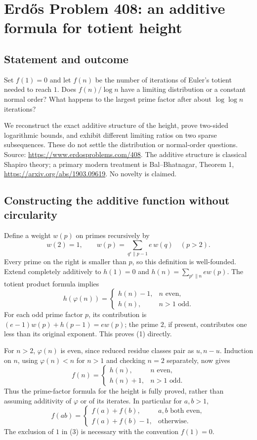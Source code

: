 \section*{Erd\H{o}s Problem 408: an additive formula for totient height}
\subsection*{Statement and outcome}
Set $f(1)=0$ and let $f(n)$ be the number of iterations of Euler's totient needed to reach $1$. Does $f(n)/\log n$ have a limiting distribution or a constant normal order? What happens to the largest prime factor after about $\log\log n$ iterations?

We reconstruct the exact additive structure of the height, prove two-sided logarithmic bounds, and exhibit different limiting ratios on two sparse subsequences. These do not settle the distribution or normal-order questions. Source: \url{https://www.erdosproblems.com/408}. The additive structure is classical Shapiro theory; a primary modern treatment is Bal--Bhatnagar, Theorem 1, \url{https://arxiv.org/abs/1903.09619}. No novelty is claimed.

\subsection*{Constructing the additive function without circularity}
Define a weight $w(p)$ on primes recursively by
\[
 w(2)=1,\qquad w(p)=\sum_{q^e\parallel p-1}e\,w(q)\quad(p>2).
\]
Every prime on the right is smaller than $p$, so this definition is well-founded. Extend completely additively to $h(1)=0$ and
$h(n)=\sum_{p^e\parallel n}e w(p)$. The totient product formula implies
\[
 h(\varphi(n))=
 \begin{cases}
 h(n)-1,&n\text{ even},\\
 h(n),&n>1\text{ odd}.
 \end{cases} \tag{1}
\]
For each odd prime factor $p$, its contribution is $(e-1)w(p)+h(p-1)=e w(p)$; the prime $2$, if present, contributes one less than its original exponent. This proves (1) directly.

For $n>2$, $\varphi(n)$ is even, since reduced residue classes pair as $u,n-u$. Induction on $n$, using $\varphi(n)<n$ for $n>1$ and checking $n=2$ separately, now gives
\[
 f(n)=\begin{cases}
 h(n),&n\text{ even},\\
 h(n)+1,&n>1\text{ odd}.
 \end{cases} \tag{2}
\]
Thus the prime-factor formula for the height is fully proved, rather than assuming additivity of $\varphi$ or of its iterates. In particular for $a,b>1$,
\[
 f(ab)=\begin{cases}
 f(a)+f(b),&a,b\text{ both even},\\
 f(a)+f(b)-1,&\text{otherwise}.
 \end{cases} \tag{3}
\]
The exclusion of $1$ in (3) is necessary with the convention $f(1)=0$.


